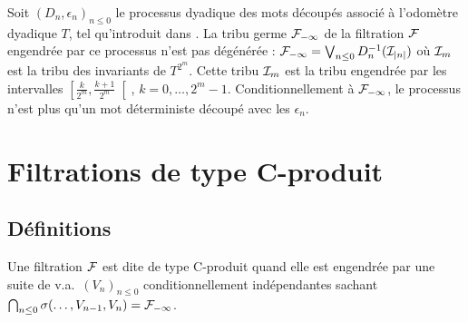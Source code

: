 \documentclass[12pt,a4paper]{article}
\begin{document}
\begin{exemple}
Soit ${(D_n, \epsilon_n)}_{n \leq 0}$ le processus dyadique des mots découpés 
associé à l'odomètre dyadique $T$, tel qu'introduit dans \cite{LauXLV}.
 La tribu germe $\mathcal{F}_{-\infty}$ de la filtration $\mathcal{F}$ engendrée par 
ce processus n'est pas dégénérée : 
$\mathcal{F}_{-\infty} = \bigvee_{n \leq 0} D_n^{-1}(\mathcal{I}_{|n|})$ où 
$\mathcal{I}_m$ est la tribu des invariants de $T^{2^m}$. 
Cette tribu $\mathcal{I}_m$ est la tribu engendrée par les intervalles 
$\left[\frac{k}{2^m}, \frac{k+1}{2^m}\right[$, $k=0, \ldots, 2^{m}-1$. 
Conditionnellement à $\mathcal{F}_{-\infty}$, le processus n'est plus qu'un 
mot déterministe découpé avec les $\epsilon_n$.
\end{exemple}



\section{Filtrations de type C-produit}

\subsection{Définitions}

\begin{definition}
Une filtration $\mathcal{F}$ est dite de type C-produit quand elle est engendrée par 
une suite de v.a.\ ${(V_n)}_{n \leq 0}$  conditionnellement indépendantes 
sachant $\bigcap_{n \leq 0}\sigma(\ldots, V_{n-1}, V_n) = \mathcal{F}_{-\infty}$.
\end{definition}
\end{document}
